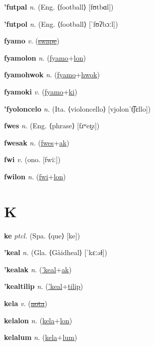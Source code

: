 \textbf{\hypertarget{'futpal}{'futpal}} \textit{n.} (Eng. ⟨football⟩ [fʊtbɑl])


\textbf{\hypertarget{'futpol}{'futpol}} \textit{n.} (Eng. ⟨football⟩ [ˈfʊʔbɔːl])


\textbf{\hypertarget{fyamo}{fyamo}} \textit{v.} (\hyperlink{swape}{\sout{swape}})


\textbf{\hypertarget{fyamolon}{fyamolon}} \textit{n.} (\hyperlink{fyamo}{fyamo}+\allowbreak \hyperlink{lon}{lon})


\textbf{\hypertarget{fyamohwok}{fyamohwok}} \textit{n.} (\hyperlink{fyamo}{fyamo}+\allowbreak \hyperlink{hwok}{hwok})


\textbf{\hypertarget{fyamoki}{fyamoki}} \textit{v.} (\hyperlink{fyamo}{fyamo}+\allowbreak \hyperlink{ki}{ki})


\textbf{\hypertarget{'fyoloncelo}{'fyoloncelo}} \textit{n.} (Ita. ⟨violoncello⟩ [vjolonˈt͡ʃɛllo])


\textbf{\hypertarget{fwes}{fwes}} \textit{n.} (Eng. ⟨phrase⟩ [fɹʷeɪ̯z])


\textbf{\hypertarget{fwesak}{fwesak}} \textit{n.} (\hyperlink{fwes}{fwes}+\allowbreak \hyperlink{ak}{ak})


\textbf{\hypertarget{fwi}{fwi}} \textit{v.} (ono. [fwiː])


\textbf{\hypertarget{fwilon}{fwilon}} \textit{n.} (\hyperlink{fwi}{fwi}+\allowbreak \hyperlink{lon}{lon})


\section{K}

\textbf{\hypertarget{ke}{ke}} \textit{ptcl.} (Spa. ⟨que⟩ [ke])


\textbf{\hypertarget{'keal}{'keal}} \textit{n.} (Gla. ⟨Gàidheal⟩ [ˈkɛːəɫ])


\textbf{\hypertarget{'kealak}{'kealak}} \textit{n.} (\hyperlink{'keal}{'keal}+\allowbreak \hyperlink{ak}{ak})


\textbf{\hypertarget{'kealtilip}{'kealtilip}} \textit{n.} (\hyperlink{'keal}{'keal}+\allowbreak \hyperlink{tilip}{tilip})


\textbf{\hypertarget{kela}{kela}} \textit{v.} (\hyperlink{nota}{\sout{nota}})


\textbf{\hypertarget{kelalon}{kelalon}} \textit{n.} (\hyperlink{kela}{kela}+\allowbreak \hyperlink{lon}{lon})


\textbf{\hypertarget{kelalum}{kelalum}} \textit{n.} (\hyperlink{kela}{kela}+\allowbreak \hyperlink{lum}{lum})


